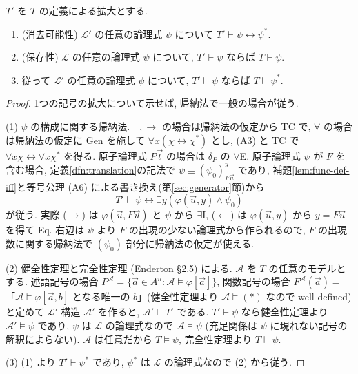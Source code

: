 \begin{thm}\label{thm:defext}
  $T'$ を $T$ の定義による拡大とする.
  \begin{enumerate}[label=(\arabic*)]
    \item (消去可能性) $\mathcal{L}'$ の任意の論理式 $\psi$ について $T' \vdash \psi \leftrightarrow \psi^\ast$.
    \item (保存性) $\mathcal{L}$ の任意の論理式 $\psi$ について, $T' \vdash \psi$ ならば $T \vdash \psi$.
    \item 従って $\mathcal{L}'$ の任意の論理式 $\psi$ について, $T' \vdash \psi$ ならば $T \vdash \psi^\ast$.
  \end{enumerate}
\end{thm}
\begin{proof}
  1つの記号の拡大について示せば, 帰納法で一般の場合が従う.

  (1) $\psi$ の構成に関する帰納法. $\neg, \to$ の場合は帰納法の仮定から TC で, $\forall$ の場合は帰納法の仮定に Gen を施して $\forall x(\chi \leftrightarrow \chi^\ast)$ とし, (A3) と TC で $\forall x\chi \leftrightarrow \forall x \chi^\ast$ を得る. 原子論理式 $P\vec t$ の場合は $\delta_P$ の $\forall$E. 原子論理式 $\psi$ が $F$ を含む場合, 定義\ref{dfn:translation}の記法で $\psi \equiv (\psi_0)^y_{F\vec u}$ であり, 補題\ref{lem:func-def-iff}と等号公理 (A6) による書き換え(第\ref{sec:generator}節)から
  \[ T' \vdash \psi \leftrightarrow \exists y(\varphi(\vec u, y) \land \psi_0) \]
  が従う. 実際 ($\to$) は $\varphi(\vec u, F\vec u)$ と $\psi$ から $\exists$I, ($\leftarrow$) は $\varphi(\vec u, y)$ から $y = F\vec u$ を得て Eq. 右辺は $\psi$ より $F$ の出現の少ない論理式から作られるので, $F$ の出現数に関する帰納法で $(\psi_0)$ 部分に帰納法の仮定が使える.

  (2) 健全性定理と完全性定理 (Enderton 	\cite{enderton} \S 2.5) による. $\mathcal{A}$ を $T$ の任意のモデルとする. 述語記号の場合 $P^{\mathcal{A}} = \{\vec a \in A^n : \mathcal{A} \vDash \varphi[\vec a]\}$, 関数記号の場合 $F^{\mathcal{A}}(\vec a) = $ 「$\mathcal{A} \vDash \varphi[\vec a, b]$ となる唯一の $b$」(健全性定理より $\mathcal{A} \vDash (\ast)$ なので well-defined)と定めて $\mathcal{L}'$ 構造 $\mathcal{A}'$ を作ると, $\mathcal{A}' \vDash T'$ である. $T' \vdash \psi$ なら健全性定理より $\mathcal{A}' \vDash \psi$ であり, $\psi$ は $\mathcal{L}$ の論理式なので $\mathcal{A} \vDash \psi$ (充足関係は $\psi$ に現れない記号の解釈によらない). $\mathcal{A}$ は任意だから $T \vDash \psi$, 完全性定理より $T \vdash \psi$.

  (3) (1) より $T' \vdash \psi^\ast$ であり, $\psi^\ast$ は $\mathcal{L}$ の論理式なので (2) から従う.
\end{proof}

